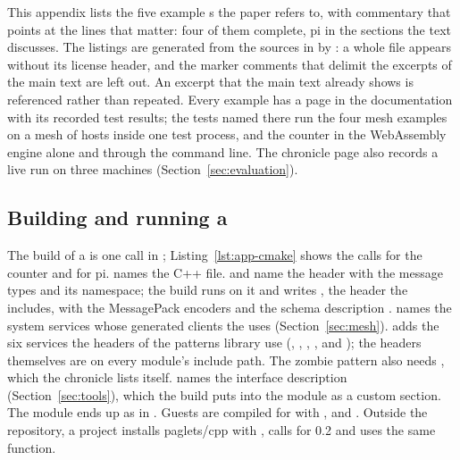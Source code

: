 
This appendix lists the five example \paglet{}s the paper refers to,
with commentary that points at the lines that matter: four of them
complete, pi in the sections the text discusses. The
listings are generated from the sources in  by
: a whole file appears without its license
header, and the  marker comments that delimit the
excerpts of the main text are left out. An excerpt that the main text
already shows is referenced rather than repeated. Every example has a page in the
documentation \cite{pagletsCppDocs} with its recorded test results; the
tests named there run the four mesh examples on a mesh of hosts inside
one test process, and the counter in the WebAssembly engine alone and
through the command line. The chronicle page also records a live run on
three machines (Section~\ref{sec:evaluation}).

\subsection{Building and running a \paglet{}}\label{sec:examples-build}

The build of a \paglet{} is one  call in
; Listing~\ref{lst:app-cmake} shows the
calls for the counter and for pi.  names the C++ file.
 and  name the header with the
message types and its namespace; the build runs  on it
and writes , the header the \paglet{} includes,
with the MessagePack encoders and the schema description
.  names the system services
whose generated clients the \paglet{} uses (Section~\ref{sec:mesh}).
 adds the six services the headers of the patterns
library use (, , ,
,  and ); the headers
themselves are on every module's include path. The zombie pattern also
needs , which the chronicle lists itself. 
names the interface description (Section~\ref{sec:tools}), which the
build puts into the module as a custom section. The module ends up as
 in . Guests are compiled for
 with ,  and
.
Outside the repository, a project installs paglets/cpp with
, calls  for 
0.2 and uses the same function.

